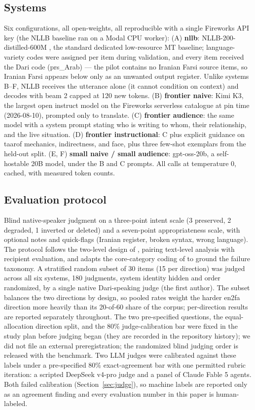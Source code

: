 \documentclass[11pt]{article}
\begin{document}
\subsection{Systems}
Six configurations, all open-weights, all reproducible with a single Fireworks API key (the NLLB baseline ran on a Modal CPU worker): (A) \textbf{nllb}: NLLB-200-distilled-600M \citep{nllb2022}, the standard dedicated low-resource MT baseline; language-variety codes were assigned per item during validation, and every item received the Dari code (prs\_Arab) --- the pilot contains no Iranian Farsi source items, so Iranian Farsi appears below only as an unwanted output register. Unlike systems B--F, NLLB receives the utterance alone (it cannot condition on context) and decodes with beam 2 capped at 120 new tokens. (B) \textbf{frontier naive}: Kimi K3, the largest open instruct model on the Fireworks serverless catalogue at pin time (2026-08-10), prompted only to translate. (C) \textbf{frontier audience}: the same model with a system prompt stating who is writing to whom, their relationship, and the live situation. (D) \textbf{frontier instructional}: C plus explicit guidance on taarof mechanics, indirectness, and face, plus three few-shot exemplars from the held-out split. (E, F) \textbf{small naive / small audience}: gpt-oss-20b, a self-hostable 20B model, under the B and C prompts. All calls at temperature 0, cached, with measured token counts.

\subsection{Evaluation protocol}
Blind native-speaker judgment on a three-point intent scale (3 preserved, 2 degraded, 1 inverted or deleted) and a seven-point appropriateness scale, with optional notes and quick-flags (Iranian register, broken syntax, wrong language). The protocol follows the two-level design of \citet{tenzer2026pragmatics}, pairing text-level analysis with recipient evaluation, and adapts the core-category coding of \citet{housekadar2021} to ground the failure taxonomy. A stratified random subset of 30 items (15 per direction) was judged across all six systems, 180 judgments, system identity hidden and order randomized, by a single native Dari-speaking judge (the first author). The subset balances the two directions by design, so pooled rates weight the harder en2fa direction more heavily than its 20-of-60 share of the corpus; per-direction results are reported separately throughout. The two pre-specified questions, the equal-allocation direction split, and the 80\% judge-calibration bar were fixed in the study plan before judging began (they are recorded in the repository history); we did not file an external preregistration; the randomized blind judging order is released with the benchmark. Two LLM judges were calibrated against these labels under a pre-specified 80\% exact-agreement bar with one permitted rubric iteration: a scripted DeepSeek v4-pro judge and a panel of Claude Fable 5 agents. Both failed calibration (Section~\ref{sec:judge}), so machine labels are reported only as an agreement finding and every evaluation number in this paper is human-labeled.
\end{document}

